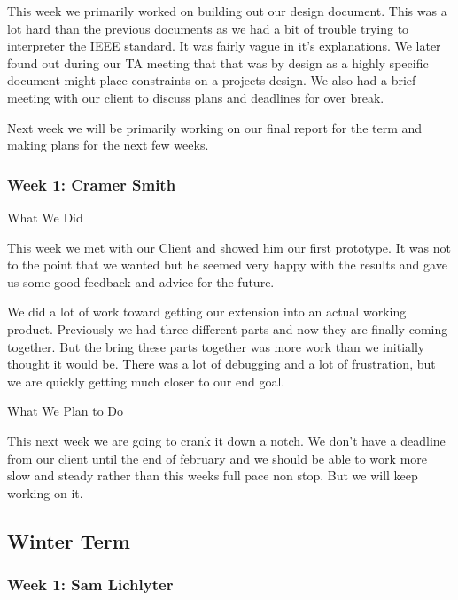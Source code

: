 This week we primarily worked on building out our design document. This was a lot hard than the previous documents as we had a bit of trouble trying to interpreter the IEEE standard. It was fairly vague in it's explanations. We later found out during our TA meeting that that was by design as a highly specific document might place constraints on a projects design. We also had a brief meeting with our client to discuss plans and deadlines for over break.



Next week we will be primarily working on our final report for the term and making plans for the next few weeks. \\ 

 \subsubsection{Week 1: Cramer Smith}

What We Did



This week we met with our Client and showed him our first prototype. It was not to the point that we wanted but he seemed very happy with the results and gave us some good feedback and advice for the future. 



We did a lot of work toward getting our extension into an actual working product. Previously we had three different parts and now they are finally coming together. But the bring these parts together was more work than we initially thought it would be. There was a lot of debugging and a lot of frustration, but we are quickly getting much closer to our end goal.



What We Plan to Do



This next week we are going to crank it down a notch. We don't have a deadline from our client until the end of february and we should be able to work more slow and steady rather than this weeks full pace non stop. But we will keep working on it. \\ 

\subsection{Winter Term}
 \subsubsection{Week 1: Sam Lichlyter}

